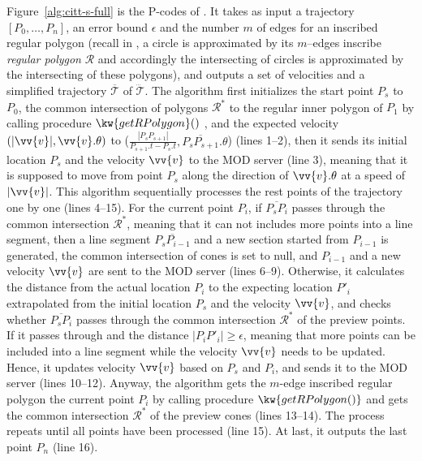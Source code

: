 Figure~\ref{alg:citt-s-full} is the P-codes of \citt. It takes as input a trajectory ${[P_0, \ldots, P_n]}$, an error bound $\epsilon$ and the number $m$ of edges for an inscribed regular polygon (recall in \cised, a circle is approximated by its $m$--edges inscribe \emph{regular polygon} $\mathcal{R}$ and accordingly the intersecting of circles is approximated by the intersecting of these polygons), and outputs a set of velocities and a simplified  trajectory $\overline{\mathcal{T}}$ of $\dddot{\mathcal{T}}$.
%
The algorithm first initializes the start point $P_s$ to $P_0$, the common intersection of polygons $\mathcal{R}^*$ to the regular inner polygon of $P_1$ by calling procedure $\kw{getRPolygon}()$ \cite{Lin:Cised}, and the expected velocity $(|\vv{v}|, \vv{v}.\theta)$ to ($\frac{|P_{s}P_{s+1}|}{P_{s+1}.t-P_s.t},\overline{P_{s}P_{s+1}}.\theta$) (lines 1--2), then it sends its initial location $P_s$ and the velocity $\vv{v}$ to the MOD server (line 3), meaning that it is supposed to move from point $P_s$ along the direction of $\vv{v}.\theta$ at a speed of $|\vv{v}|$.
%
This algorithm sequentially processes the rest points of the trajectory one by one (lines 4--15). 
For the current point $P_{i}$, if $\overline{P_sP_{i}}$ passes through the common intersection $\mathcal{R}^*$, meaning that it can not includes more points into a line segment, then a line segment $\overline{P_sP_{i-1}}$ and a new section started from  $P_{i-1}$ is generated, the common intersection of cones is set to null, and $P_{i-1}$ and a new velocity $\vv{v}$ are sent to the MOD server (lines 6--9).
%
Otherwise, it calculates the distance from the actual location $P_{i}$ to the expecting location $P'_{i}$ extrapolated from the initial location $P_s$ and the velocity $\vv{v}$, and checks whether $\overline{P_sP_{i}}$ passes through the common intersection $\mathcal{R}^*$ of the preview points.
If it passes through and the distance $|P_{i}P'_{i}| \ge \epsilon$, meaning that more points can be included into a line segment while the velocity $\vv{v}$ needs to be updated. Hence, it updates velocity $\vv{v}$ based on $P_s$ and $P_{i}$, and sends it to the MOD server (lines 10--12). 
%
Anyway, the algorithm gets the $m$-edge inscribed regular polygon \wrt the current point $P_{i}$ by calling procedure $\kw{getRPolygon()}$ \cite{Lin:Cised} and gets the common intersection $\mathcal{R}^*$ of the preview cones (lines 13--14). The process repeats until all points have been processed (line 15).
At last, it outputs the last point $P_{n}$ (line 16).
%






